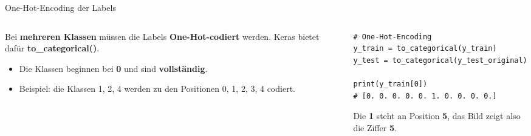 \makequestionspage{\FRAGENIMAGE}



\begin{frame}[fragile]{One-Hot-Encoding der Labels}
\begin{columns}
\begin{column}{0.47\textwidth}
Bei \textbf{mehreren Klassen} müssen die Labels \textbf{One-Hot-codiert} werden. Keras bietet dafür \textbf{to\_categorical()}.
\begin{itemize}
\item Die Klassen beginnen bei \textbf{0} und sind \textbf{vollständig}.
\item Beispiel: die Klassen 1, 2, 4 werden zu den Positionen 0, 1, 2, 3, 4 codiert.
\end{itemize}
\end{column}
\begin{column}{0.48\textwidth}
\begin{verbatim}
# One-Hot-Encoding
y_train = to_categorical(y_train)
y_test = to_categorical(y_test_original)

print(y_train[0])
# [0. 0. 0. 0. 0. 1. 0. 0. 0. 0.]
\end{verbatim}

\vspace{0.3em}
Die \textbf{1} steht an Position \textbf{5}, das Bild zeigt also die Ziffer \textbf{5}.
\end{column}
\end{columns}
\end{frame}


